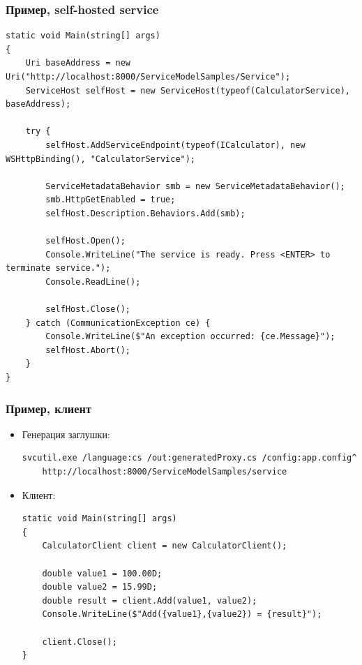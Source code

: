 \documentclass[xetex,mathserif,serif]{beamer}
\begin{document}
	\begin{frame}[fragile]
		\frametitle{Пример, self-hosted service}
		\begin{scriptsize}
			\begin{verbatim}
static void Main(string[] args) 
{
    Uri baseAddress = new Uri("http://localhost:8000/ServiceModelSamples/Service");
    ServiceHost selfHost = new ServiceHost(typeof(CalculatorService), baseAddress);

    try {
        selfHost.AddServiceEndpoint(typeof(ICalculator), new WSHttpBinding(), "CalculatorService");

        ServiceMetadataBehavior smb = new ServiceMetadataBehavior();
        smb.HttpGetEnabled = true;
        selfHost.Description.Behaviors.Add(smb);

        selfHost.Open();
        Console.WriteLine("The service is ready. Press <ENTER> to terminate service.");
        Console.ReadLine();

        selfHost.Close();  
    } catch (CommunicationException ce) {
        Console.WriteLine($"An exception occurred: {ce.Message}");
        selfHost.Abort();
    }
}
			\end{verbatim}
		\end{scriptsize}
	\end{frame}

	\begin{frame}[fragile]
		\frametitle{Пример, клиент}
		\begin{itemize}
			\item Генерация заглушки: 
				\begin{scriptsize}
					\begin{verbatim}
svcutil.exe /language:cs /out:generatedProxy.cs /config:app.config^
    http://localhost:8000/ServiceModelSamples/service
					\end{verbatim}
				\end{scriptsize}
			\item Клиент:
				\begin{footnotesize}
					\begin{verbatim}
static void Main(string[] args)
{
    CalculatorClient client = new CalculatorClient();

    double value1 = 100.00D;
    double value2 = 15.99D;
    double result = client.Add(value1, value2);
    Console.WriteLine($"Add({value1},{value2}) = {result}");

    client.Close();
}
					\end{verbatim}
				\end{footnotesize}
		\end{itemize}
	\end{frame}
\end{document}

